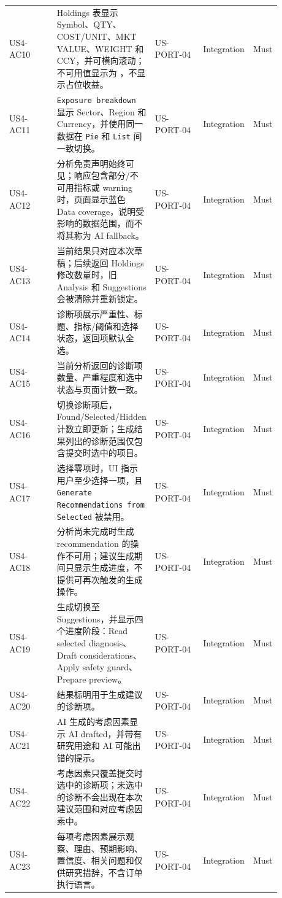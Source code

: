 \begin{longtable}{L{0.18\linewidth}L{0.30\linewidth}L{0.18\linewidth}L{0.12\linewidth}L{0.10\linewidth}}
US4-AC10 & Holdings 表显示 Symbol、QTY、COST/\allowbreak{}UNIT、MKT VALUE、WEIGHT 和 CCY，并可横向滚动；不可用值显示为 \textemdash{}，不显示占位收益。 & US-PORT-04 & Integration & Must \\
US4-AC11 & \texttt{Exposure breakdown} 显示 Sector、Region 和 Currency，并使用同一数据在 \texttt{Pie} 和 \texttt{List} 间一致切换。 & US-PORT-04 & Integration & Must \\
US4-AC12 & 分析免责声明始终可见；响应包含部分/\allowbreak{}不可用指标或 warning 时，页面显示蓝色 Data coverage，说明受影响的数据范围，而不将其称为 AI fallback。 & US-PORT-04 & Integration & Must \\
US4-AC13 & 当前结果只对应本次草稿；后续返回 Holdings 修改数量时，旧 Analysis 和 Suggestions 会被清除并重新锁定。 & US-PORT-04 & Integration & Must \\
US4-AC14 & 诊断项展示严重性、标题、指标/\allowbreak{}阈值和选择状态，返回项默认全选。 & US-PORT-04 & Integration & Must \\
US4-AC15 & 当前分析返回的诊断项数量、严重程度和选中状态与页面计数一致。 & US-PORT-04 & Integration & Must \\
US4-AC16 & 切换诊断项后，Found/\allowbreak{}Selected/\allowbreak{}Hidden 计数立即更新；生成结果列出的诊断范围仅包含提交时选中的项目。 & US-PORT-04 & Integration & Must \\
US4-AC17 & 选择零项时，UI 指示用户至少选择一项，且 \texttt{Generate Recommendations from  Selected} 被禁用。 & US-PORT-04 & Integration & Must \\
US4-AC18 & 分析尚未完成时生成 recommendation 的操作不可用；建议生成期间只显示生成进度，不提供可再次触发的生成操作。 & US-PORT-04 & Integration & Must \\
US4-AC19 & 生成切换至 Suggestions，并显示四个进度阶段：Read selected diagnosis、Draft considerations、Apply safety guard、Prepare preview。 & US-PORT-04 & Integration & Must \\
US4-AC20 & 结果标明用于生成建议的诊断项。 & US-PORT-04 & Integration & Must \\
US4-AC21 & AI 生成的考虑因素显示 AI drafted，并带有研究用途和 AI 可能出错的提示。 & US-PORT-04 & Integration & Must \\
US4-AC22 & 考虑因素只覆盖提交时选中的诊断项；未选中的诊断不会出现在本次建议范围和对应考虑因素中。 & US-PORT-04 & Integration & Must \\
US4-AC23 & 每项考虑因素展示观察、理由、预期影响、置信度、相关问题和仅供研究措辞，不含订单执行语言。 & US-PORT-04 & Integration & Must \\

\end{longtable}
